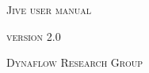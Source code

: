 \documentclass[a4paper,10pt,english]{book}
\begin{document}
\begin{titlepage}

  \begin{center}

    \vspace*{2cm}

    {\Huge \textsc{Jive user manual}}

    \vspace{1cm}

    {\large \textsc{version 2.0}}

    \vspace{2cm}

    {\large \textsc{Dynaflow Research Group}}

  \end{center}

\end{titlepage}

\tableofcontents




%
\end{document}
